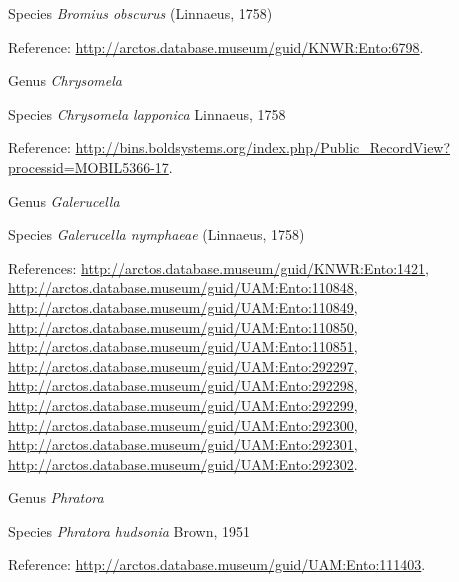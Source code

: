 \documentclass[9pt, article]{memoir}
\begin{document}
\begin{multicols}{2}
\vspace{6pt}\noindent\hspace{36pt}Species \textit{Bromius obscurus} (Linnaeus, 1758)


\vspace{6pt}Reference: 
\url{http://arctos.database.museum/guid/KNWR:Ento:6798}.

\vspace{6pt}\noindent\hspace{30pt}Genus \textit{Chrysomela}


\vspace{6pt}\noindent\hspace{36pt}Species \textit{Chrysomela lapponica} Linnaeus, 1758


\vspace{6pt}Reference: 
\url{http://bins.boldsystems.org/index.php/Public_RecordView?processid=MOBIL5366-17}.

\vspace{6pt}\noindent\hspace{30pt}Genus \textit{Galerucella}


\vspace{6pt}\noindent\hspace{36pt}Species \textit{Galerucella nymphaeae} (Linnaeus, 1758)


\vspace{6pt}References: 
\url{http://arctos.database.museum/guid/KNWR:Ento:1421}, 
\url{http://arctos.database.museum/guid/UAM:Ento:110848}, 
\url{http://arctos.database.museum/guid/UAM:Ento:110849}, 
\url{http://arctos.database.museum/guid/UAM:Ento:110850}, 
\url{http://arctos.database.museum/guid/UAM:Ento:110851}, 
\url{http://arctos.database.museum/guid/UAM:Ento:292297}, 
\url{http://arctos.database.museum/guid/UAM:Ento:292298}, 
\url{http://arctos.database.museum/guid/UAM:Ento:292299}, 
\url{http://arctos.database.museum/guid/UAM:Ento:292300}, 
\url{http://arctos.database.museum/guid/UAM:Ento:292301}, 
\url{http://arctos.database.museum/guid/UAM:Ento:292302}.

\vspace{6pt}\noindent\hspace{30pt}Genus \textit{Phratora}


\vspace{6pt}\noindent\hspace{36pt}Species \textit{Phratora hudsonia} Brown, 1951


\vspace{6pt}Reference: 
\url{http://arctos.database.museum/guid/UAM:Ento:111403}.


\end{multicols}
\end{document}
